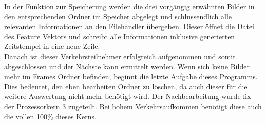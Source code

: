 In der Funktion zur Speicherung werden die drei vorgängig erwähnten Bilder in den entsprechenden Ordner im Speicher abgelegt und schlussendlich alle relevanten Informationen an den Filehandler übergeben. Dieser öffnet die Datei des Feature Vektors und schreibt alle Informationen inklusive generierten Zeitstempel in eine neue Zeile.\\
Danach ist dieser Verkehrsteilnehmer erfolgreich aufgenommen und somit abgeschlossen und der Nächste kann ermittelt werden.
Wenn sich keine Bilder mehr im Frames Ordner befinden, beginnt die letzte Aufgabe dieses Programms. Dies bedeutet, den eben bearbeiten Ordner zu löschen, da auch dieser für die weitere Auswertung nicht mehr benötigt wird. Der Nachbearbeitung wurde fix der Prozessorkern 3 zugeteilt. Bei hohem Verkehrsaufkommen benötigt diese auch die vollen 100\% dieses Kerns. \cite{OpenCVCC}

